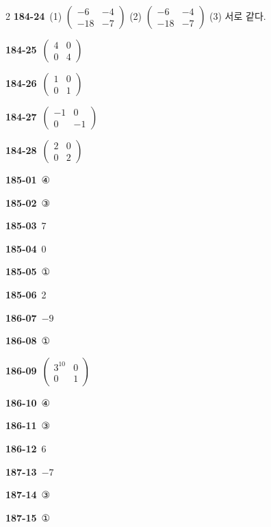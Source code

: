 \documentclass[10pt,a4paper]{article}
\begin{document}
\begin{multicols}{2}
\noindent\textbf{184-24}\ (1) $\begin{pmatrix} -6 & -4 \\ -18 & -7 \end{pmatrix}$ (2) $\begin{pmatrix} -6 & -4 \\ -18 & -7 \end{pmatrix}$ (3) 서로 같다.\par
\noindent\textbf{184-25}\ $\begin{pmatrix} 4 & 0 \\ 0 & 4 \end{pmatrix}$\par
\noindent\textbf{184-26}\ $\begin{pmatrix} 1 & 0 \\ 0 & 1 \end{pmatrix}$\par
\noindent\textbf{184-27}\ $\begin{pmatrix} -1 & 0 \\ 0 & -1 \end{pmatrix}$\par
\noindent\textbf{184-28}\ $\begin{pmatrix} 2 & 0 \\ 0 & 2 \end{pmatrix}$\par
\noindent\textbf{185-01}\ ④\par
\noindent\textbf{185-02}\ ③\par
\noindent\textbf{185-03}\ 7\par
\noindent\textbf{185-04}\ 0\par
\noindent\textbf{185-05}\ ①\par
\noindent\textbf{185-06}\ 2\par
\noindent\textbf{186-07}\ $-9$\par
\noindent\textbf{186-08}\ ①\par
\noindent\textbf{186-09}\ $\begin{pmatrix} 3^{10} & 0 \\ 0 & 1 \end{pmatrix}$\par
\noindent\textbf{186-10}\ ④\par
\noindent\textbf{186-11}\ ③\par
\noindent\textbf{186-12}\ 6\par
\noindent\textbf{187-13}\ $-7$\par
\noindent\textbf{187-14}\ ③\par
\noindent\textbf{187-15}\ ①\par

\end{multicols}
\end{document}
